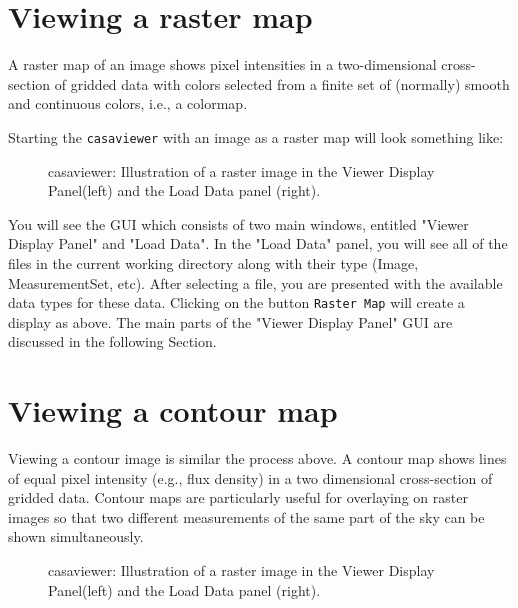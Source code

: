 \section{Viewing a raster map}
\label{section:view.raster}

A raster map of an image shows pixel intensities in a two-dimensional
cross-section of gridded data with colors selected from a finite set
of (normally) smooth and continuous colors, i.e., a colormap.

Starting the {\tt casaviewer} with an image as a raster map will look
something like: 

\begin{figure}[h!]
\caption{\label{fig:viewer1} casaviewer: Illustration of a raster
  image in the Viewer Display Panel(left) and the Load Data panel
  (right).} 
\hrulefill
\end{figure}
 

You will see the GUI which consists of two main windows, entitled
"Viewer Display Panel" and "Load Data". In the "Load Data" panel, you
will see all of the files in the current working directory along with
their type (Image, MeasurementSet, etc).  After selecting a file, you
are presented with the available data types for these data. Clicking
on the button {\tt Raster Map} will create a display as above. The main
parts of the "Viewer Display Panel" GUI are discussed in the following
Section.

\section{Viewing a contour map}
\label{section:view.contour}

Viewing a contour image is similar the process above. A contour map
shows lines of equal pixel intensity (e.g., flux density) in a two
dimensional cross-section of gridded data. Contour maps are
particularly useful for overlaying on raster images so that two
different measurements of the same part of the sky can be shown
simultaneously. 

\begin{figure}[h!]
\caption{\label{fig:viewer5} casaviewer: Illustration of a raster
  image in the Viewer Display Panel(left) and the Load Data panel
  (right).} 
\hrulefill
\end{figure}
 
